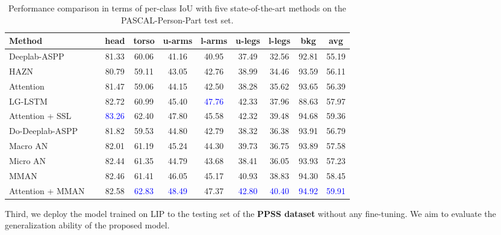 \documentclass[runningheads]{llncs}
\begin{document}
\begin{table}[t]
\centering
\scriptsize
\tabcolsep 0.08in
\caption{Performance comparison in terms of per-class IoU with five state-of-the-art methods on the PASCAL-Person-Part test set.}
\label{tab:Pascal}
\begin{tabular}{l|cccccccc}
\toprule[0.7pt]
Method                                  &   head    &   torso   &   u-arms  &   l-arms  &   u-legs  &   l-legs  &   bkg &   avg \\
\hline
Deeplab-ASPP~\cite{chen2016deeplab}		&   81.33	&   60.06   &   41.16   &   40.95   &   37.49   &   32.56   &   92.81   &   55.19   \\
HAZN~\cite{xia2016zoom}					&   80.79   &   59.11   &   43.05   &   42.76   &   38.99   &   34.46   &   93.59   &   56.11   \\
Attention~\cite{chen2016attention}      &   81.47   &   59.06   &   44.15   &   42.50   &   38.28   &   35.62   &   93.65   &   56.39   \\
LG-LSTM~\cite{liang2016lgLSTM} 			&   82.72   &   60.99   &   45.40   &   \textcolor{blue}{47.76} &   42.33   &   37.96   &   88.63   &   57.97   \\
Attention + SSL~\cite{gong2017look}~~~~~		& \textcolor{blue}{83.26}   &   62.40   &   47.80   &   45.58   &   42.32   &   39.48   &   94.68   &   59.36   \\
\hline
Do-Deeplab-ASPP  						&   81.82   &   59.53   &   44.80   &   42.79   &   38.32   &   36.38   &   93.91   &   56.79   \\
Macro AN                                &   82.01	&   61.19  	&   45.24   &   44.30   &   39.73   &   36.75   &   93.89   &   57.58   \\
Micro AN                                &   82.44	&   61.35  	&   44.79   &   43.68   &   38.41   &   36.05   &   93.93   &   57.23   \\
\hline
MMAN                                    &   82.46	&   61.41  	&   46.05   &   45.17   &   40.93   &   38.83   &   94.30   &   58.45   \\
Attention + MMAN						&   82.58   &   \textcolor{blue}{62.83} &   \textcolor{blue}{48.49} &   47.37   &   \textcolor{blue}{42.80}  &   \textcolor{blue}{40.40} &   \textcolor{blue}{94.92} &   \textcolor{blue}{59.91} \\
\bottomrule[0.7pt]
\end{tabular}
\end{table}

Third, we deploy the model trained on LIP to the testing set of the \textbf{PPSS dataset} without any fine-tuning. We aim to evaluate the generalization ability of the proposed model.
\end{document}
